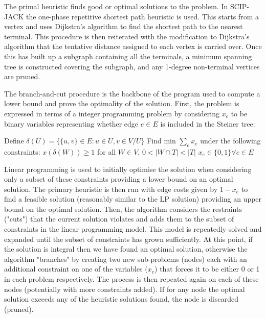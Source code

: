 The primal heuristic finds good or optimal solutions to the problem. In SCIP-JACK the one-phase repetitive shortest path heuristic \cite{aragao2002implementation} is used. This starts from a vertex and uses Dijkstra’s algorithm \cite{dijkstra2022note} to find the shortest path to the nearest terminal. This procedure is then reiterated with the modification to Dijkstra’s algorithm that the tentative distance assigned to each vertex is carried over. Once this has built up a subgraph containing all the terminals, a minimum spanning tree is constructed covering the subgraph, and any 1-degree non-terminal vertices are pruned.

The branch-and-cut procedure is the backbone of the program used to compute a lower bound and prove the optimality of the solution. First, the problem is expressed in terms of a integer programming problem by considering $x_e$ to be binary variables representing whether edge $e \in E$ is included in the Steiner tree:

\begin{algorithm}
\centering
\caption*{\label{alg:steinerTreeCut}\textsc{Steiner Tree Problem Undirected Cut Formulation}}
\begin{minipage}{.4\linewidth}
\begin{algorithmic}[1]
\Statex Define $\delta (U) =\{\{u,v\} \in E: u \in U, v \in V/U \}$
\Statex
\Statex Find min $\sum_e x_e$ under the following constraints:
\State $x(\delta (W)) \geq 1$ for all $W \in V$, $0 < |W \cap T| < |T|$
\State $x_e \in \{0,1\} \forall e \in E$
\end{algorithmic}
\end{minipage}
\end{algorithm}

Linear programming is used to initially optimise the solution when considering only a subset of these constraints providing a lower bound on an optimal solution. The primary heuristic is then run with edge costs given by $1-x_e$ to find a feasible solution (reasonably similar to the LP solution) providing an upper bound on the optimal solution. Then, the algorithm considers the restraints ("cuts") that the current solution violates and adds them to the subset of constraints in the linear programming model. This model is repeatedly solved and expanded until the subset of constraints has grown sufficiently. At this point, if the solution is integral then we have found an optimal solution, otherwise the algorithm "branches" by creating two new sub-problems (nodes) each with an additional constraint on one of the variables ($x_e$) that forces it to be either 0 or 1 in each problem respectively. The process is then repeated again on each of these nodes (potentially with more constraints added). If for any node the optimal solution exceeds any of the heuristic solutions found, the node is discarded (pruned).
\newpage
